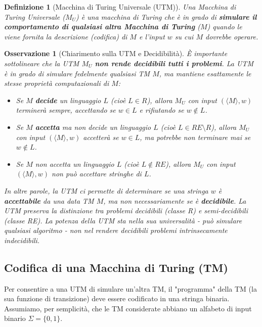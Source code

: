 \documentclass[a4paper]{article}
\newtheorem{definition}{Definizione}
\newtheorem{remark}{Osservazione}
\begin{document}
\begin{definition}[Macchina di Turing Universale (UTM)]
Una Macchina di Turing Universale ($M_U$) è una macchina di Turing che è in grado di \textbf{simulare il comportamento di qualsiasi altra Macchina di Turing} ($M$) quando le viene fornita la descrizione (codifica) di $M$ e l'input $w$ su cui $M$ dovrebbe operare.
\end{definition}

\begin{remark}[Chiarimento sulla UTM e Decidibilità]
È importante sottolineare che la UTM $M_U$ \textbf{non rende decidibili tutti i problemi}. La UTM è in grado di simulare fedelmente qualsiasi TM $M$, ma mantiene esattamente le stesse proprietà computazionali di $M$:

\begin{itemize}
    \item Se $M$ \textbf{decide} un linguaggio $L$ (cioè $L \in R$), allora $M_U$ con input $(\langle M \rangle, w)$ terminerà sempre, accettando se $w \in L$ e rifiutando se $w \notin L$.
    \item Se $M$ \textbf{accetta} ma non decide un linguaggio $L$ (cioè $L \in RE \setminus R$), allora $M_U$ con input $(\langle M \rangle, w)$ accetterà se $w \in L$, ma potrebbe non terminare mai se $w \notin L$.
    \item Se $M$ non accetta un linguaggio $L$ (cioè $L \notin RE$), allora $M_U$ con input $(\langle M \rangle, w)$ non può accettare stringhe di $L$.
\end{itemize}

In altre parole, la UTM ci permette di determinare se una stringa $w$ è \textbf{accettabile} da una data TM $M$, ma non necessariamente se è \textbf{decidibile}. La UTM preserva la distinzione tra problemi decidibili (classe R) e semi-decidibili (classe RE). La potenza della UTM sta nella sua \textit{universalità} - può simulare qualsiasi algoritmo - non nel rendere decidibili problemi intrinsecamente indecidibili.
\end{remark}

\subsection{Codifica di una Macchina di Turing (TM)}

Per consentire a una UTM di simulare un'altra TM, il "programma" della TM (la sua funzione di transizione) deve essere codificato in una stringa binaria. Assumiamo, per semplicità, che le TM considerate abbiano un alfabeto di input binario $\Sigma = \{0,1\}$.
\end{document}
